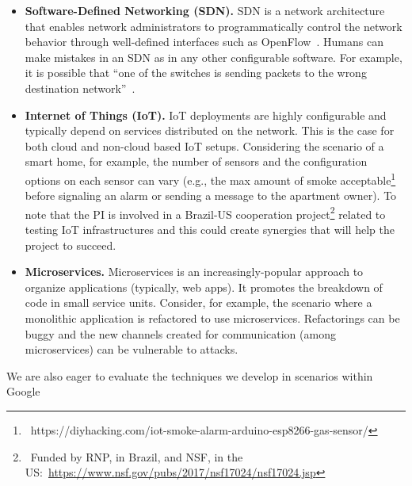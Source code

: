 \documentclass[11pt]{article}
\newcommand{\Comment}[1]{}
\begin{document}
\begin{itemize}
  \setlength\itemsep{0.01em}
\item \textbf{Software-Defined Networking (SDN).} SDN is a network
  architecture that enables network administrators to programmatically
  control the network behavior through well-defined interfaces such as
  OpenFlow~\cite{open-networking}. Humans can make mistakes in an SDN
  as in any other configurable software.  For example, it is possible
  that ``one of the switches is sending packets to the wrong
  destination network''~\cite{scott-etal-nsdi2015}.
\item \textbf{Internet of Things (IoT).} IoT deployments are highly
  configurable and typically depend on services distributed on the
  network. This is the case for both cloud and non-cloud based IoT
  setups. Considering the scenario of a smart home, for example, the
  number of sensors and the configuration options on each sensor can
  vary (e.g., the max amount of smoke
  acceptable\footnote{~https://diyhacking.com/iot-smoke-alarm-arduino-esp8266-gas-sensor/}
  before signaling an alarm or sending a message to the apartment
  owner).  To note that the PI is involved in a Brazil-US cooperation
  project\footnote{~Funded by RNP, in Brazil, and NSF, in the
    US:~\url{https://www.nsf.gov/pubs/2017/nsf17024/nsf17024.jsp}}
  related to testing IoT infrastructures and this could create
  synergies that will help the project to succeed.
  
\item \textbf{Microservices.} Microservices is an increasingly-popular
  approach to organize applications (typically, web apps). It promotes
  the breakdown of code in small service units\Comment{ that
    communicate through lightweight protocols}. Consider, for example,
  the scenario where a monolithic application is refactored to use
  microservices. Refactorings can be buggy and the new channels
  created for communication (among microservices) can be vulnerable to
  attacks. 
\end{itemize}


We are also eager to evaluate the techniques we develop in scenarios
within Google
\end{document}
